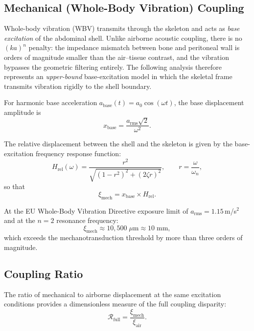 \subsection{Mechanical (Whole-Body Vibration) Coupling}\label{sec:wbv}

Whole-body vibration (WBV) transmits through the skeleton and acts as
\emph{base excitation} of the abdominal shell.  Unlike airborne acoustic
coupling, there is no $(ka)^n$ penalty: the impedance mismatch between bone
and peritoneal wall is orders of magnitude smaller than the air--tissue
contrast, and the vibration bypasses the geometric filtering entirely.  The
following analysis therefore represents an \emph{upper-bound} base-excitation
model in which the skeletal frame transmits vibration rigidly to the shell
boundary.

For harmonic base acceleration $a_\mathrm{base}(t) = a_0 \cos(\omega t)$, the
base displacement amplitude is
\begin{equation}\label{eq:xbase}
  x_\mathrm{base} = \frac{a_\mathrm{rms} \sqrt{2}}{\omega^2}.
\end{equation}

The relative displacement between the shell and the skeleton is given by the
base-excitation frequency response function:
\begin{equation}\label{eq:Hrel}
  H_\mathrm{rel}(\omega) = \frac{r^2}{\sqrt{(1-r^2)^2 + (2\zeta r)^2}},
  \qquad r = \frac{\omega}{\omega_n},
\end{equation}
so that
\begin{equation}\label{eq:xi_mech}
  \xi_\mathrm{mech} = x_\mathrm{base} \times H_\mathrm{rel}.
\end{equation}

At the EU Whole-Body Vibration Directive exposure limit of
$a_\mathrm{rms} = 1.15$\,m/s$^2$ and at the $n = 2$ resonance frequency:
\begin{equation}
  \xi_\mathrm{mech} \approx 10{,}500\;\mu\text{m} \approx 10\;\text{mm},
\end{equation}
which exceeds the mechanotransduction threshold by more than three orders
of magnitude.


\subsection{Coupling Ratio}\label{sec:ratio}

The ratio of mechanical to airborne displacement at the same excitation
conditions provides a dimensionless measure of the full coupling disparity:
\begin{equation}\label{eq:coupling_ratio_def}
  \mathcal{R}_\mathrm{full} = \frac{\xi_\mathrm{mech}}{\xi_\mathrm{air}}.
\end{equation}

